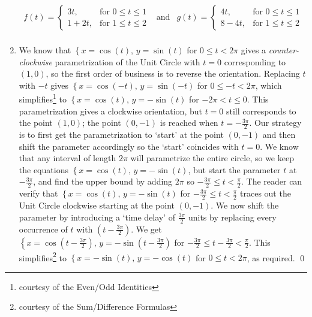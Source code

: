 \begin{ex}
\begin{enumerate}
\[ \begin{array}{ccc}

f(t) = \left\{ \begin{array}{rl} 3t, & \text{for $0 \leq t \leq 1$} \\ 1+2t, & \text{for $1 \leq t \leq 2$} \end{array} \right. & \text{and} &  g(t) = \left\{ \begin{array}{rl} 4t, & \text{for $0 \leq t \leq 1$} \\ 8-4t, & \text{for $1 \leq t \leq 2$} \end{array} \right. \\

\end{array}\]

\item  We know that $\left\{ x = \cos(t), \, y = \sin(t) \right.$ for $0 \leq t < 2\pi$ gives a \textit{counter-clockwise} parametrization of the Unit Circle with $t = 0$ corresponding to $(1,0)$, so the first order of business is to reverse the orientation.  Replacing $t$ with $-t$ gives $\left\{ x = \cos(-t), \, y = \sin(-t) \right.$ for $0 \leq -t < 2\pi$, which simplifies\footnote{courtesy of the Even/Odd Identities} to $\left\{ x = \cos(t), \, y = -\sin(t) \right.$ for  $-2\pi <  t \leq  0$.  This parametrization gives a clockwise orientation, but $t=0$ still corresponds to the point $(1,0)$; the point $(0, -1)$ is reached when $t = -\frac{3\pi}{2}$.  Our strategy is to first get the parametrization to `start' at the point $(0,-1)$ and then shift the parameter accordingly so the `start' coincides with $t = 0$.  We know that any interval of length $2\pi$ will parametrize the entire circle, so we keep the equations $\left\{ x = \cos(t), \, y = -\sin(t) \right.$, but start the parameter $t$ at $-\frac{3\pi}{2}$, and find the upper bound by adding $2\pi$ so $-\frac{3\pi}{2} \leq t < \frac{\pi}{2}$.  The reader can verify that   $\left\{ x = \cos(t), \, y = -\sin(t) \right.$ for $-\frac{3\pi}{2} \leq t < \frac{\pi}{2}$ traces out the Unit Circle clockwise starting at the point $(0, -1)$.  We now shift the parameter by introducing a `time delay' of $\frac{3\pi}{2}$ units by replacing every occurrence of $t$ with $\left(t - \frac{3\pi}{2}\right)$.  We get $\left\{ x = \cos\left(t - \frac{3\pi}{2}\right), \, y = -\sin\left(t - \frac{3\pi}{2}\right) \right.$ for  $-\frac{3\pi}{2} \leq t - \frac{3\pi}{2} < \frac{\pi}{2}$.  This simplifies\footnote{courtesy of the Sum/Difference Formulas} to $\left\{ x = -\sin(t), \, y = -\cos(t) \right.$ for $ 0 \leq t  < 2\pi$, as required. \qed

\end{enumerate}

\end{ex}

